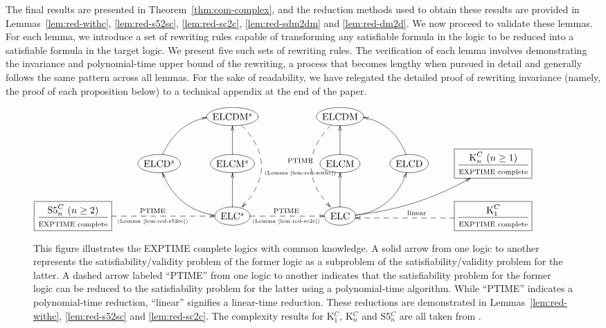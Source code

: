 \documentclass{article}
\newcommand{\lc}{\text{\normalfont ELC}\xspace}
\newcommand{\lcd}{\text{\normalfont ELCD}\xspace}
\newcommand{\lcm}{\text{\normalfont ELCM}\xspace}
\newcommand{\lcdm}{\text{\normalfont ELCDM}\xspace}
\newcommand{\lsc}{\text{\normalfont ELC$^s$}\xspace}
\newcommand{\lscd}{\text{\normalfont ELCD$^s$}\xspace}
\newcommand{\lscm}{\text{\normalfont ELCM$^s$}\xspace}
\newcommand{\lscdm}{\text{\normalfont ELCDM$^s$}\xspace}
\begin{document}
The final results are presented in Theorem~\ref{thm:com-complex}, and the reduction methods used to obtain these results are provided in Lemmas~\ref{lem:red-withc}, \ref{lem:red-s52sc}, \ref{lem:red-sc2c}, \ref{lem:red-sdm2dm} and \ref{lem:red-dm2d}. We now proceed to validate these lemmas. For each lemma, we introduce a set of rewriting rules capable of transforming any satisfiable formula in the logic to be reduced into a satisfiable formula in the target logic. We present five such sets of rewriting rules. The verification of each lemma involves demonstrating the invariance and polynomial-time upper bound of the rewriting, a process that becomes lengthy when pursued in detail and generally follows the same pattern across all lemmas. For the sake of readability, we have relegated the detailed proof of rewriting invariance (namely, the proof of each proposition below) to a technical appendix at the end of the paper.

\begin{figure}
\footnotesize
\centering
$\xymatrix@C=2.7em{
&&*++o[F]{\lscdm}\ar@/^2.5pc/@{-->}[dd]^{\text{\begin{tabular}{@{}c@{}}
PTIME\\\tiny(Lemma~\ref{lem:red-withc})
\end{tabular}}}
&&*++o[F]{\lcdm}\ar@/_2.5pc/@{-->}[dd]
\\
&*++o[F]{\lscd}\ar@/^1.5pc/[ur]
&*++o[F]{\lscm}\ar[u]
&&*++o[F]{\lcm}\ar[u]
&*++o[F]{\lcd}\ar@/_1.5pc/[ul]
&*+[F]{\dfrac{\textrm{K}^C_n\ (n \geq 1)}{\text{\scriptsize EXPTIME complete}}}
\\
*+[F]{\dfrac{\textrm{S5}^C_n\ (n \geq 2)}{\text{\scriptsize EXPTIME complete}}}\ar@{-->}[rr]^{\text{PTIME}}_{\text{\tiny(Lemma~\ref{lem:red-s52sc})}}
&&*++o[F]{\lsc}\ar@/^1.5pc/[lu]\ar[u]\ar@{-->}[rr]^{\text{PTIME}}_{\text{\tiny(Lemma~\ref{lem:red-sc2c})}}
&& *++o[F]{\lc}\ar[u]\ar@/_1.5pc/[ur]\ar@/_1pc/[urr]
&& *+[F]{\dfrac{\textrm{K}^C_1}{\text{\scriptsize EXPTIME complete}}}\ar@{-->}@<2pt>[ll]_{\text{linear}}
}$
\caption{This figure illustrates the EXPTIME complete logics with common knowledge. A solid arrow from one logic to another represents the satisfiability/validity problem of the former logic as a subproblem of the satisfiability/validity problem for the latter. A dashed arrow labeled ``PTIME'' from one logic to another indicates that the satisfiability problem for the former logic can be reduced to the satisfiability problem for the latter using a polynomial-time algorithm. While ``PTIME'' indicates a polynomial-time reduction, ``linear'' signifies a linear-time reduction. These reductions are demonstrated in Lemmas~\ref{lem:red-withc}, \ref{lem:red-s52sc} and \ref{lem:red-sc2c}. The complexity results for \textrm{K}$_1^C$, \textrm{K}$_n^C$ and \textrm{S5}$_n^C$ are all taken from \cite[Section 3.5]{FHMV1995}.}\label{fig:sat-withc}
\end{figure}
\end{document}
